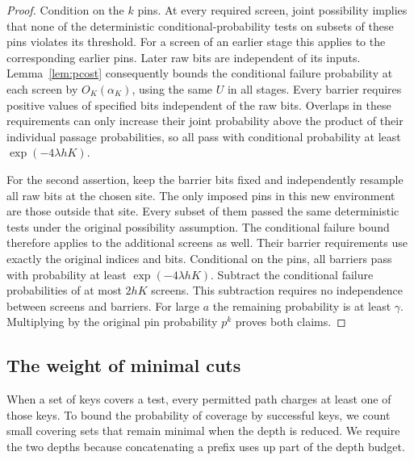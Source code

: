 \begin{proof}
Condition on the $k$ pins. At every required screen, joint possibility
implies that none of the deterministic conditional-probability tests on
subsets of these pins violates its threshold. For a screen of an earlier
stage this applies to the corresponding earlier pins. Later raw bits are
independent of its inputs. Lemma~\ref{lem:pcost} consequently bounds the
conditional failure probability at each screen by $O_K(\alpha_K)$,
using the same $U$ in all stages. Every barrier requires positive
values of specified bits independent of the raw bits. Overlaps in these
requirements can only increase their joint probability above the product
of their individual passage probabilities, so all pass with conditional
probability at least $\exp(-4\lambda hK)$.

For the second assertion, keep the barrier bits fixed and independently
resample all raw bits at the chosen site. The only imposed pins in this
new environment are those outside that site. Every subset of them
passed the same deterministic tests under the original possibility
assumption. The conditional failure bound therefore applies to the
additional screens as well. Their barrier requirements use exactly the
original indices and bits. Conditional on the pins, all barriers pass
with probability at least \(\exp(-4\lambda hK)\). Subtract the
conditional failure probabilities of at most \(2hK\) screens.
This subtraction requires no independence between screens and
barriers. For large \(a\) the remaining probability is at least
\(\gamma\). Multiplying by the original pin probability \(p^k\)
proves both claims.
\end{proof}

\subsection{The weight of minimal cuts}

When a set of keys covers a test, every permitted path charges at least
one of those keys. To bound the probability of coverage by successful
keys, we count small covering sets that remain minimal when the depth
is reduced.
We require the two depths because concatenating a prefix uses up part
of the depth budget.

